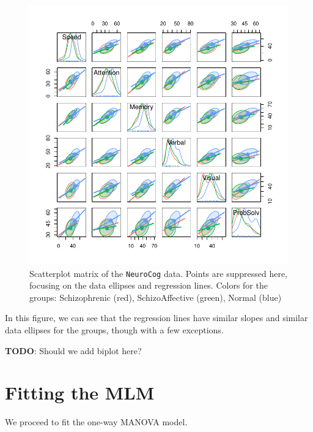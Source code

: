 \documentclass[
  letterpaper,
  10pt,
  krantz2]{krantz}
\begin{document}
\begin{figure}[H]

{\centering \includegraphics[width=1\textwidth,height=\textheight]{figs/fig-NC-scatmat-1.pdf}

}

\caption{\label{fig-NC-scatmat}Scatterplot matrix of the
\texttt{NeuroCog} data. Points are suppressed here, focusing on the data
ellipses and regression lines. Colors for the groups: Schizophrenic
(red), SchizoAffective (green), Normal (blue)}

\end{figure}

In this figure, we can see that the regression lines have similar slopes
and similar data ellipses for the groups, though with a few exceptions.

\textbf{TODO}: Should we add biplot here?

\hypertarget{fitting-the-mlm}{%
\section{Fitting the MLM}\label{fitting-the-mlm}}

We proceed to fit the one-way MANOVA model.
\end{document}
